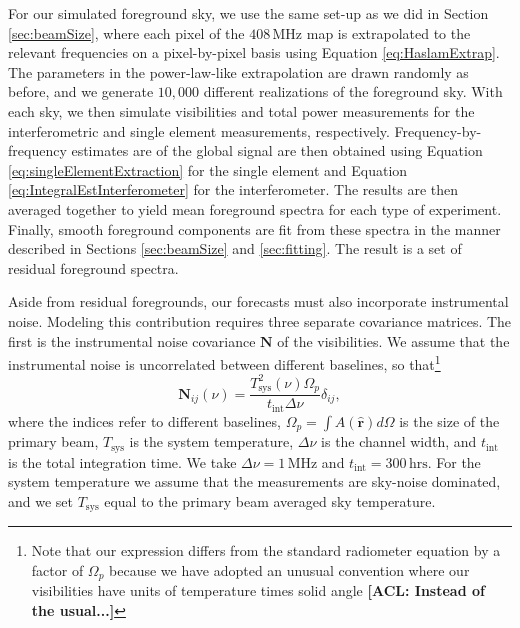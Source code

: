 \documentclass[twolcolumn,apj,iop,numberedappendix]{emulateapj}
\newcommand{\N}{\mathbf{N}}
\newcommand{\acl}[1]{{\color{red} \textbf{[ACL:  #1]}}}
\begin{document}
For our simulated foreground sky, we use the same set-up as we did in Section \ref{sec:beamSize}, where each pixel of the $408\,\textrm{MHz}$ map is extrapolated to the relevant frequencies on a pixel-by-pixel basis using Equation \eqref{eq:HaslamExtrap}. The parameters in the power-law-like extrapolation are drawn randomly as before, and we generate $10,000$ different realizations of the foreground sky. With each sky, we then simulate visibilities and total power measurements for the interferometric and single element measurements, respectively. Frequency-by-frequency estimates are of the global signal are then obtained using Equation \eqref{eq:singleElementExtraction} for the single element and Equation \eqref{eq:IntegralEstInterferometer} for the interferometer. The results are then averaged together to yield mean foreground spectra for each type of experiment. Finally, smooth foreground components are fit from these spectra in the manner described in Sections \ref{sec:beamSize} and \ref{sec:fitting}. The result is a set of residual foreground spectra.

Aside from residual foregrounds, our forecasts must also incorporate instrumental noise. Modeling this contribution requires three separate covariance matrices. The first is the instrumental noise covariance $\N$ of the visibilities. We assume that the instrumental noise is uncorrelated between different baselines, so that\footnote{Note that our expression differs from the standard radiometer equation by a factor of $\Omega_p$ because we have adopted an unusual convention where our visibilities have units of temperature times solid angle\acl{Instead of the usual...}}
\begin{equation}
\N_{ij} (\nu) = \frac{T^2_\textrm{sys}(\nu) \Omega_p}{t_\textrm{int} \Delta \nu} \delta_{ij},
\end{equation}
where the indices refer to different baselines, $\Omega_p = \int  A(\mathbf{\hat{r}}) d\Omega$ is the size of the primary beam, $T_\textrm{sys}$ is the system temperature, $\Delta \nu$ is the channel width, and $t_\textrm{int}$ is the total integration time. We take $\Delta \nu = 1\,\textrm{MHz}$ and $t_\textrm{int} = 300\,\textrm{hrs}$. For the system temperature we assume that the measurements are sky-noise dominated, and we set $T_\textrm{sys}$ equal to the primary beam averaged sky temperature.
\end{document}
